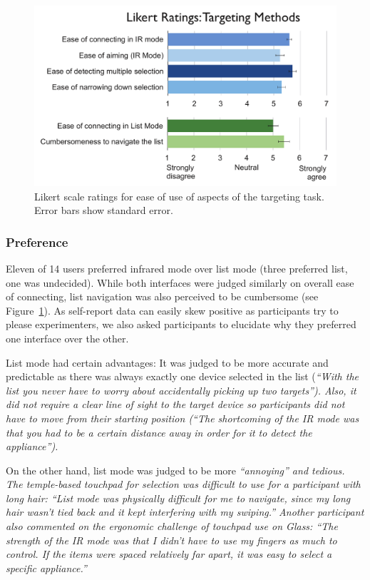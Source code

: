 \documentclass{sigchi}
\newcommand {\studyquote}[1]{\em ``#1''\normalfont}
\begin{document}
\begin{figure}[t]
\centering
\includegraphics[width=1.0\columnwidth]{figures/target-likert.pdf}
\caption{Likert scale ratings for ease of use of aspects of the targeting task. Error bars show standard error. }
\label{fig:target-likert}
\end{figure}

\subsubsection{Preference}

Eleven of 14 users preferred infrared mode over list mode (three preferred list, one was undecided). While both interfaces were judged similarly on overall ease of connecting, list navigation was also perceived to be cumbersome (see Figure~\ref{fig:target-likert}). As self-report data can easily skew positive as participants try to please experimenters, we also asked participants to elucidate why they preferred one interface over the other.

List mode had certain advantages: It was judged to be more accurate and predictable as there was always exactly one device selected in the list (\studyquote{With the list you never have to worry about accidentally picking up two targets}). Also, it did not require a clear line of sight to the target device so participants did not have to move from their starting position (\studyquote{The shortcoming of the IR mode was that you had to be a certain distance away in order for it to detect the appliance}). 

On the other hand, list mode was judged to be more \studyquote{annoying} and tedious. The temple-based touchpad for selection was difficult to use for a participant with long hair: \studyquote{List mode was physically difficult for me to navigate, since my long hair wasn't tied back and it kept interfering with my swiping.} Another participant also commented on the ergonomic challenge of touchpad use on Glass: \studyquote{The strength of the IR mode was that I didn't have to use my fingers as much to control. If the items were spaced relatively far apart, it was easy to select a specific appliance.}
\end{document}
